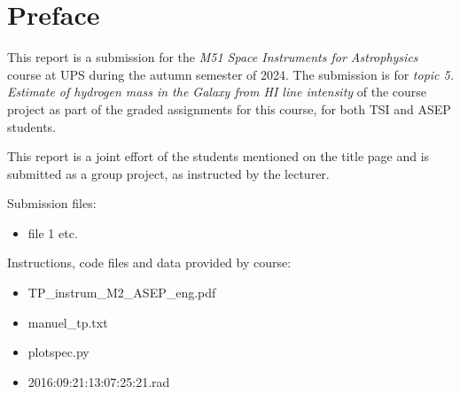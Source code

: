 \section*{Preface}

This report is a submission for the \textit{M51 Space Instruments for Astrophysics} course at \ac{UPS} during the autumn semester of 2024.
The submission is for \textit{topic 5. Estimate of hydrogen mass in the Galaxy from HI line intensity} of the course project as part of the graded assignments for this course, for both \ac{TSI} and \ac{ASEP} students. 

This report is a joint effort of the students mentioned on the title page and is submitted as a group project, as instructed by the lecturer.



Submission files:
\begin{itemize}
    \item file 1 etc.
\end{itemize}

Instructions, code files and data provided by course:
\begin{itemize}
    \item TP\_instrum\_M2\_ASEP\_eng.pdf
    \item manuel\_tp.txt
    \item plotspec.py
    \item 2016:09:21:13:07:25:21.rad
\end{itemize}


\vspace{2cm}






